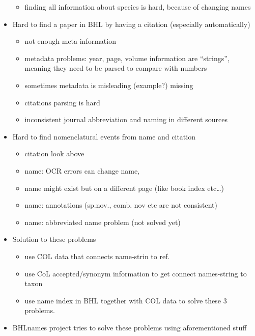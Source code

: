 \documentclass[
]{article}
\providecommand{\tightlist}{%
  \setlength{\itemsep}{0pt}\setlength{\parskip}{0pt}}
\begin{document}
\begin{itemize}
  \begin{itemize}
  \tightlist
  \item
    finding all information about species is hard, because of changing
    names
  \end{itemize}
\item
  Hard to find a paper in BHL by having a citation (especially
  automatically)

  \begin{itemize}
  \tightlist
  \item
    not enough meta information
  \item
    metadata problems: year, page, volume information are ``strings'',
    meaning they need to be parsed to compare with numbers
  \item
    sometimes metadata is misleading (example?) missing
  \item
    citations parsing is hard
  \item
    inconsistent journal abbreviation and naming in different sources
  \end{itemize}
\item
  Hard to find nomenclatural events from name and citation

  \begin{itemize}
  \tightlist
  \item
    citation look above
  \item
    name: OCR errors can change name,
  \item
    name might exist but on a different page (like book index etc\ldots)
  \item
    name: annotations (sp.nov., comb. nov etc are not consistent)
  \item
    name: abbreviated name problem (not solved yet)
  \end{itemize}
\item
  Solution to these problems

  \begin{itemize}
  \tightlist
  \item
    use COL data that connects name-strin to ref.
  \item
    use CoL accepted/synonym information to get connect names-string to
    taxon
  \item
    use name index in BHL together with COL data to solve these 3
    problems.
  \end{itemize}
\item
  BHLnames project tries to solve these problems using aforementioned
  stuff
\end{itemize}
\end{document}
